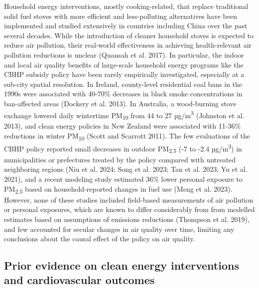 \documentclass[
  letterpaper,
  DIV=11,
  numbers=noendperiod]{scrartcl}
\begin{document}
Household energy interventions, mostly cooking-related, that replace
traditional solid fuel stoves with more efficient and less-polluting
alternatives have been implemented and studied extensively in countries
including China over the past several decades. While the introduction of
cleaner household stoves is expected to reduce air pollution, their
real-world effectiveness in achieving health-relevant air pollution
reductions is unclear (Quansah et al. 2017). In particular, the indoor
and local air quality benefits of large-scale household energy programs
like the CBHP subsidy policy have been rarely empirically investigated,
especially at a sub-city spatial resolution. In Ireland, county-level
residential coal bans in the 1990s were associated with 40-70\%
decreases in black smoke concentrations in ban-affected areas (Dockery
et al. 2013). In Australia, a wood-burning stove exchange lowered daily
wintertime PM\textsubscript{10} from 44 to 27 µg/m\textsuperscript{3}
(Johnston et al. 2013), and clean energy policies in New Zealand were
associated with 11-36\% reductions in winter PM\textsubscript{10} (Scott
and Scarrott 2011). The few evaluations of the CBHP policy reported
small decreases in outdoor PM\textsubscript{2.5} (-7 to -2.4
µg/m\textsuperscript{3}) in municipalities or prefectures treated by the
policy compared with untreated neighboring regions (Niu et al. 2024;
Song et al. 2023; Tan et al. 2023; Yu et al. 2021), and a recent
modeling study estimated 36\% lower personal exposure to
PM\textsubscript{2.5} based on household-reported changes in fuel use
(Meng et al. 2023). However, none of these studies included field-based
measurements of air pollution or personal exposures, which are known to
differ considerably from from modelled estimates based on assumptions of
emissions reductions (Thompson et al. 2019), and few accounted for
secular changes in air quality over time, limiting any conclusions about
the causal effect of the policy on air quality.

\subsection{Prior evidence on clean energy interventions and
cardiovascular
outcomes}\label{prior-evidence-on-clean-energy-interventions-and-cardiovascular-outcomes}
\end{document}

